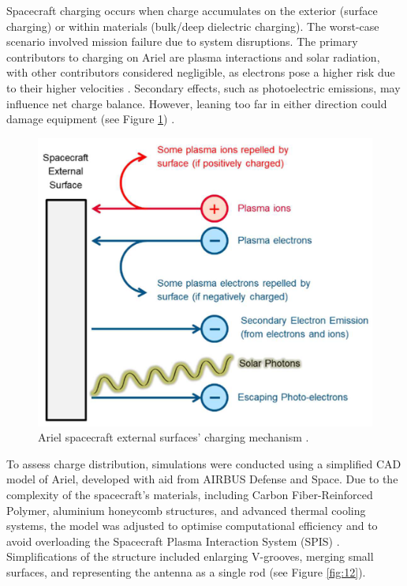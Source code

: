 \documentclass[12pt]{article}
\begin{document}
Spacecraft charging occurs when charge accumulates on the exterior (surface charging) or within materials (bulk/deep dielectric charging). The worst-case scenario involved mission failure due to system disruptions. The primary contributors to charging on Ariel are plasma interactions and
solar radiation, with other contributors considered negligible, as electrons pose a higher risk due to their higher velocities \cite{Michelagnoli_Focardi_Pudney_Renouf_Merola_Noce_Nunez_Dinuzzi_Chiarucci_2024}. Secondary effects, such as photoelectric emissions, may influence net charge balance. However, leaning too far in either
direction could damage equipment (see Figure \ref{fig:10}) \cite{Michelagnoli_Focardi_Pudney_Renouf_Merola_Noce_Nunez_Dinuzzi_Chiarucci_2024}. 

\begin{figure}[H]
    \centering
    \includegraphics[width=.5\textwidth]{surface charging.png}
    \caption{Ariel spacecraft external surfaces' charging mechanism \protect\cite{Michelagnoli_Focardi_Pudney_Renouf_Merola_Noce_Nunez_Dinuzzi_Chiarucci_2024}.}
    \label{fig:10}  
\end{figure}

To assess charge distribution, simulations were conducted using a simplified CAD model of Ariel, developed with aid from AIRBUS Defense and Space. Due to the complexity of the spacecraft's materials, including Carbon Fiber-Reinforced Polymer, aluminium honeycomb structures, and 
advanced thermal cooling systems, the model was adjusted to optimise computational efficiency and to avoid overloading the Spacecraft Plasma Interaction System (SPIS) \cite{Michelagnoli_Focardi_Pudney_Renouf_Merola_Noce_Nunez_Dinuzzi_Chiarucci_2024}.
Simplifications of the structure included enlarging V-grooves, merging small surfaces, and representing the antenna as a single rod  (see Figure \ref{fig:12}).
\end{document}
